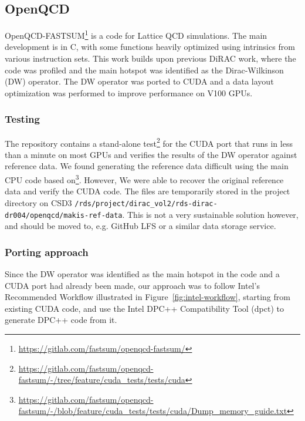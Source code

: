 
\subsection{OpenQCD}\label{sec:openqcd}

OpenQCD-FASTSUM\footnote{\url{https://gitlab.com/fastsum/openqcd-fastsum/}} is a code for Lattice QCD simulations.
The main development is in C, with some functions heavily optimized using intrinsics from various instruction sets.
This work builds upon previous DiRAC work, where the code was profiled and the main hotspot was identified as the Dirac-Wilkinson (DW) operator.
The DW operator was ported to CUDA and a data layout optimization was performed to improve performance on V100 GPUs.

\subsubsection{Testing}\label{testing_openqcd}

The repository contains a stand-alone test\footnote{\url{https://gitlab.com/fastsum/openqcd-fastsum/-/tree/feature/cuda_tests/tests/cuda}} for the CUDA port that runs in less than a minute on most GPUs and verifies the results of the DW operator against reference data.
We found generating the reference data difficult using the main CPU code based on\footnote{\url{https://gitlab.com/fastsum/openqcd-fastsum/-/blob/feature/cuda_tests/tests/cuda/Dump\_memory\_guide.txt}}.
However, We were able to recover the original reference data and verify the CUDA code.
The files are temporarily stored in the project directory on CSD3 \texttt{/rds/project/dirac\_vol2/rds-dirac-dr004/openqcd/makis-ref-data}.
This is not a very sustainable solution however, and should be moved to, e.g. GitHub LFS or a similar data storage service.


\subsubsection{Porting approach}\label{sec:openqcd_porting}

Since the DW operator was identified as the main hotspot in the code and a CUDA port had already been made, our approach was to follow Intel's Recommended Workflow illustrated in Figure~\ref{fig:intel-workflow}, starting from existing CUDA code, and use the Intel DPC++ Compatibility Tool (dpct) to generate DPC++ code from it.

